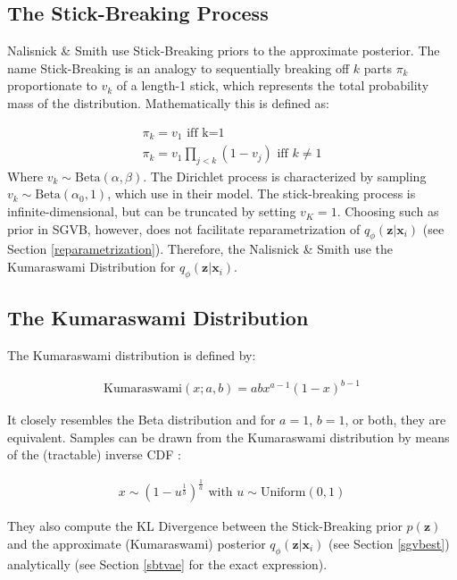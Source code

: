 \documentclass{report}
\begin{document}
\subsection{The Stick-Breaking Process}\label{sb_process}

Nalisnick \& Smith \cite{nalisnick2016deep} use Stick-Breaking priors to the approximate posterior. The name Stick-Breaking is an analogy to sequentially breaking off $k$ parts $\pi_k$ proportionate to $v_k$ of a length-1 stick, which represents the total probability mass of the distribution. Mathematically this is defined as:

\begin{align*}
\pi_k = v_1 \text{ iff k=1} \\
\pi_k = v_1 \prod_{j<k}(1-v_j) \text{ iff } k\ne 1
\end{align*}
Where $v_k \sim \text{Beta}(\alpha, \beta)$. 
The Dirichlet process is characterized by sampling $v_k \sim \text{Beta} (\alpha_0,1)$, which  \cite{nalisnick2016deep} use in their model. 
The stick-breaking process is infinite-dimensional, but can be truncated by setting $v_K = 1$. Choosing such as prior in SGVB, however, does not facilitate reparametrization of $q_\phi(\mathbf{z}|\mathbf{x}_i)$ (see Section \ref{reparametrization}). Therefore, the Nalisnick \& Smith \cite{nalisnick2016deep} use the Kumaraswami Distribution for $q_\phi(\mathbf{z}|\mathbf{x}_i)$. 

\subsection{The Kumaraswami Distribution}\label{kum}

The Kumaraswami distribution is defined by: 

\begin{align}
\text{Kumaraswami}(x;a,b) = abx^{a-1}(1-x)^{b-1}
\end{align} 

It closely resembles the Beta distribution and for $a=1$, $b=1$, or both, they are equivalent. Samples can be drawn from the Kumaraswami distribution by means of the (tractable) inverse CDF \cite{nalisnick2016deep}:

\begin{align}
x \sim (1-u^{\frac{1}{b}})^{\frac{1}{a}} \text{     with    } u \sim \text{Uniform}(0,1) 
\end{align}

They also compute the KL Divergence between the Stick-Breaking prior $p(\mathbf{z})$ and the approximate (Kumaraswami) posterior $q_\phi(\mathbf{z}|\mathbf{x}_i)$ (see Section \ref{sgvbest}) analytically (see Section \ref{sbtvae} for the exact expression). 
\end{document}
